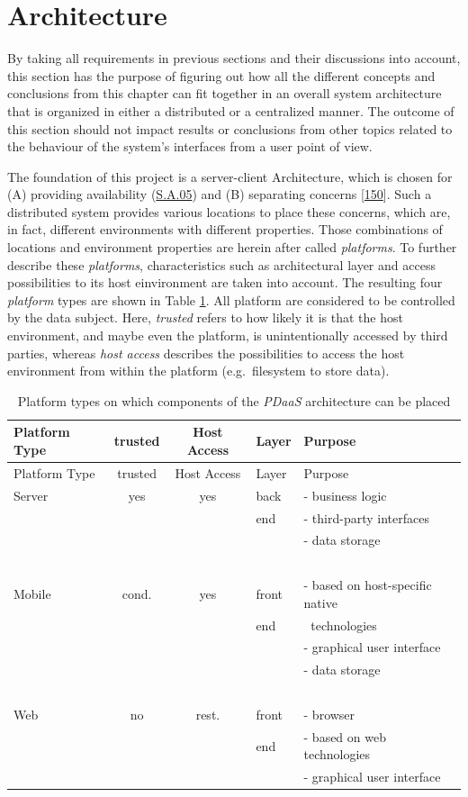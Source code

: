 \documentclass[12pt,english,a4paper,titlepage,cleardoublepage=empty,dottedtoc]{report}
\begin{document}
\section{Architecture}\label{architecture}

By taking all requirements in previous sections and their discussions
into account, this section has the purpose of figuring out how all the
different concepts and conclusions from this chapter can fit together in
an overall system architecture that is organized in either a distributed
or a centralized manner. The outcome of this section should not impact
results or conclusions from other topics related to the behaviour of the
system's interfaces from a user point of view.

The foundation of this project is a server-client Architecture, which is
chosen for (A) providing availability (\protect\hyperlink{sa05}{S.A.05})
and (B) separating concerns
{[}\protect\hyperlink{ref-web_2016_wikipedia_separation-of-concerns}{150}{]}.
Such a distributed system provides various locations to place these
concerns, which are, in fact, different environments with different
properties. Those combinations of locations and environment properties
are herein after called \emph{platforms}. To further describe these
\emph{platforms}, characteristics such as architectural layer and access
possibilities to its host einvironment are taken into account. The
resulting four \emph{platform} types are shown in Table
\ref{tbl:platforms-characteristics}. All platform are considered to be
controlled by the data subject. Here, \emph{trusted} refers to how
likely it is that the host environment, and maybe even the platform, is
unintentionally accessed by third parties, whereas \emph{host access}
describes the possibilities to access the host environment from within
the platform (e.g.~filesystem to store data).

\begin{longtable}[]{@{}lccll@{}}
\caption{Platform types on which components of the \emph{PDaaS}
architecture can be placed
\label{tbl:platforms-characteristics}}\tabularnewline
\toprule
Platform Type & trusted & Host Access & Layer & Purpose\tabularnewline
\midrule
\endfirsthead
\toprule
Platform Type & trusted & Host Access & Layer & Purpose\tabularnewline
\midrule
\endhead
Server & yes & yes & back & - business logic\tabularnewline
\(\ \) & \(\ \) & \(\ \) & end & - third-party interfaces\tabularnewline
\(\ \) & \(\ \) & \(\ \) & \(\ \) & - data storage\tabularnewline
\(\ \) & \(\ \) & \(\ \) & \(\ \) & \(\ \)\tabularnewline
Mobile & cond. & yes & front & - based on host-specific
native\tabularnewline
\(\ \) & \(\ \) & \(\ \) & end & \(\ \) technologies\tabularnewline
\(\ \) & \(\ \) & \(\ \) & \(\ \) & - graphical user
interface\tabularnewline
\(\ \) & \(\ \) & \(\ \) & \(\ \) & - data storage\tabularnewline
\(\ \) & \(\ \) & \(\ \) & \(\ \) & \(\ \)\tabularnewline
Web & no & rest. & front & - browser\tabularnewline
\(\ \) & \(\ \) & \(\ \) & end & - based on web
technologies\tabularnewline
\(\ \) & \(\ \) & \(\ \) & \(\ \) & - graphical user
interface\tabularnewline
\bottomrule
\end{longtable}
\end{document}
